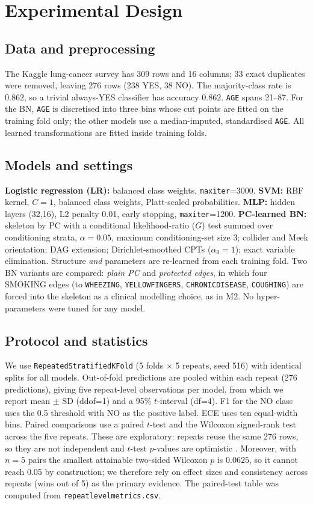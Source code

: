 \documentclass[10pt,twocolumn,letterpaper]{article}
\renewcommand{\_}{\textunderscore\hspace{0pt}}
\newcommand{\V}[1]{{\texttt{\footnotesize #1}}}
\begin{document}
\section{Experimental Design}
\subsection{Data and preprocessing}
The Kaggle lung-cancer survey \cite{kaggle} has 309 rows and 16 columns; 33 exact duplicates were removed, leaving 276 rows (238 YES, 38 NO). The majority-class rate is $0.862$, so a trivial always-YES classifier has accuracy $0.862$. \V{AGE} spans 21--87. For the BN, \V{AGE} is discretised into three bins whose cut points are fitted on the training fold only; the other models use a median-imputed, standardised \V{AGE}. All learned transformations are fitted inside training folds.

\subsection{Models and settings}
\textbf{Logistic regression (LR):} balanced class weights, \texttt{max\_iter}=3000. \textbf{SVM:} RBF kernel, $C=1$, balanced class weights, Platt-scaled probabilities. \textbf{MLP:} hidden layers (32,16), L2 penalty 0.01, early stopping, \texttt{max\_iter}=1200. \textbf{PC-learned BN:} skeleton by PC with a conditional likelihood-ratio ($G$) test summed over conditioning strata, $\alpha=0.05$, maximum conditioning-set size 3; collider and Meek orientation; DAG extension; Dirichlet-smoothed CPTs ($\alpha_0=1$); exact variable elimination. Structure \emph{and} parameters are re-learned from each training fold. Two BN variants are compared: \emph{plain PC} and \emph{protected edges}, in which four SMOKING edges (to \V{WHEEZING}, \V{YELLOW\_FINGERS}, \V{CHRONIC\_DISEASE}, \V{COUGHING}) are forced into the skeleton as a clinical modelling choice, as in M2. No hyper-parameters were tuned for any model.

\subsection{Protocol and statistics}
We use \texttt{RepeatedStratifiedKFold} (5 folds $\times$ 5 repeats, seed 516) with identical splits for all models. Out-of-fold predictions are pooled within each repeat (276 predictions), giving five repeat-level observations per model, from which we report mean $\pm$ SD (ddof=1) and a 95\% $t$-interval (df=4). F1 for the NO class uses the 0.5 threshold with NO as the positive label. ECE uses ten equal-width bins. Paired comparisons use a paired $t$-test and the Wilcoxon signed-rank test across the five repeats. These are exploratory: repeats reuse the same 276 rows, so they are not independent and $t$-test $p$-values are optimistic \cite{nadeau}. Moreover, with $n=5$ pairs the smallest attainable two-sided Wilcoxon $p$ is $0.0625$, so it cannot reach 0.05 by construction; we therefore rely on effect sizes and consistency across repeats (wins out of 5) as the primary evidence. The paired-test table was computed from \texttt{repeat\_level\_metrics.csv}.
\end{document}
